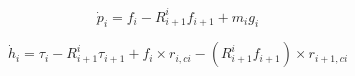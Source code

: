 \begin{equation}\label{linear_equi}
\dot{p}_i = f_i - R^i_{i+1} f_{i+1} + m_i g_i
\end{equation}

\begin{equation}\label{angular_equi}
\dot{h}_i = \tau_i - R^i_{i+1}\tau_{i+1} + f_i \times r_{i,ci}-\left ( R^i_{i+1}f_{i+1} \right ) \times r_{i+1,ci}
\end{equation}







